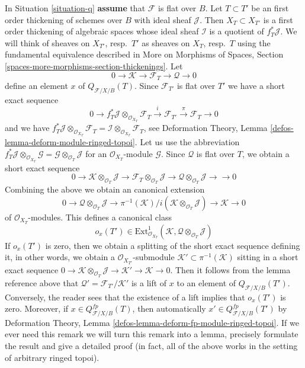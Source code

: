 \begin{remark}
\label{remark-q-obs}
In Situation \ref{situation-q} {\bf assume} that $\mathcal{F}$ is flat
over $B$. Let $T \subset T'$ be an first order
thickening of schemes over $B$ with ideal sheaf $\mathcal{J}$. Then
$X_T \subset X_{T'}$ is a first order thickening of algebraic spaces
whose ideal sheaf $\mathcal{I}$ is a quotient of $f_T^*\mathcal{J}$.
We will think of sheaves on $X_{T'}$, resp.\ $T'$ as sheaves on
$X_T$, resp.\ $T$ using the fundamental equivalence described in
More on Morphisms of Spaces, Section
\ref{spaces-more-morphisms-section-thickenings}.
Let
$$
0 \to \mathcal{K} \to \mathcal{F}_T \to \mathcal{Q} \to 0
$$
define an element $x$ of $Q_{\mathcal{F}/X/B}(T)$. Since $\mathcal{F}_{T'}$
is flat over $T'$ we have a short exact sequence
$$
0 \to f_T^*\mathcal{J} \otimes_{\mathcal{O}_{X_T}} \mathcal{F}_T
\xrightarrow{i} \mathcal{F}_{T'} \xrightarrow{\pi} \mathcal{F}_T \to 0
$$
and we have
$f_T^*\mathcal{J} \otimes_{\mathcal{O}_{X_T}} \mathcal{F}_T =
\mathcal{I} \otimes_{\mathcal{O}_{X_T}} \mathcal{F}_T$, see
Deformation Theory, Lemma \ref{defos-lemma-deform-module-ringed-topoi}.
Let us use the abbreviation
$
f_T^*\mathcal{J} \otimes_{\mathcal{O}_{X_T}} \mathcal{G} =
\mathcal{G} \otimes_{\mathcal{O}_T} \mathcal{J}
$
for an $\mathcal{O}_{X_T}$-module $\mathcal{G}$.
Since $\mathcal{Q}$ is flat over $T$, we obtain a short exact sequence
$$
0 \to
\mathcal{K} \otimes_{\mathcal{O}_T} \mathcal{J} \to
\mathcal{F}_T \otimes_{\mathcal{O}_T} \mathcal{J} \to
\mathcal{Q} \otimes_{\mathcal{O}_T} \mathcal{J} \to
\to 0
$$
Combining the above we obtain an canonical extension
$$
0 \to \mathcal{Q} \otimes_{\mathcal{O}_T} \mathcal{J} \to
\pi^{-1}(\mathcal{K})/i(\mathcal{K} \otimes_{\mathcal{O}_T} \mathcal{J}) \to
\mathcal{K} \to 0
$$
of $\mathcal{O}_{X_T}$-modules. This defines a canonical class
$$
o_x(T') \in
\text{Ext}^1_{\mathcal{O}_{X_T}}(\mathcal{K},
\mathcal{Q} \otimes_{\mathcal{O}_T} \mathcal{J})
$$
If $o_x(T')$ is zero, then we obtain a splitting of the short
exact sequence defining it, in other words, we obtain a
$\mathcal{O}_{X_{T'}}$-submodule
$\mathcal{K}' \subset \pi^{-1}(\mathcal{K})$ sitting in a short
exact sequence
$0 \to \mathcal{K} \otimes_{\mathcal{O}_T} \mathcal{J} \to
\mathcal{K}' \to \mathcal{K} \to 0$.
Then it follows from the lemma reference above that
$\mathcal{Q}' = \mathcal{F}_{T'}/\mathcal{K}'$
is a lift of $x$ to an element of $Q_{\mathcal{F}/X/B}(T')$.
Conversely, the reader sees that the existence of
a lift implies that $o_x(T')$ is zero. Moreover, if
$x \in Q_{\mathcal{F}/X/B}^{fp}(T)$, then automatically
$x' \in Q_{\mathcal{F}/X/B}^{fp}(T')$ by
Deformation Theory, Lemma \ref{defos-lemma-deform-fp-module-ringed-topoi}.
If we ever need this
remark we will turn this remark into a lemma, precisely formulate
the result and give a detailed proof (in fact, all of the above
works in the setting of arbitrary ringed topoi).
\end{remark}

